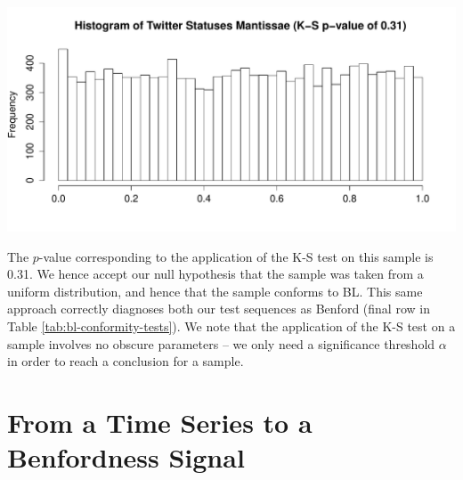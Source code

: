 \documentclass[twoside,leqno,twocolumn]{article}\usepackage[]{graphicx}\usepackage[]{color}
\makeatletter
\def\maxwidth{ %
  \ifdim\Gin@nat@width>\linewidth
    \linewidth
  \else
    \Gin@nat@width
  \fi
}
\newenvironment{knitrout}{}{} %
\makeatother
\begin{document}

\noindent
\begin{knitrout}
\color{fgcolor}
\includegraphics[width=\maxwidth]{figure/conformity-test-twitter-example-1} 

\end{knitrout}

The $p$-value corresponding to the application of the K-S test on this sample is 0.31. We hence accept our null hypothesis that the sample was taken from a uniform distribution, and hence that the sample conforms to BL. This same approach correctly diagnoses both our test sequences as Benford (final row in Table \ref{tab:bl-conformity-tests}). We note that the application of the K-S test on a sample involves no obscure parameters -- we only need a significance threshold $\alpha$ in order to reach a conclusion for a sample.

\section{From a Time Series to a Benfordness Signal}
\label{sec:extr-benf-sign}
\end{document}
